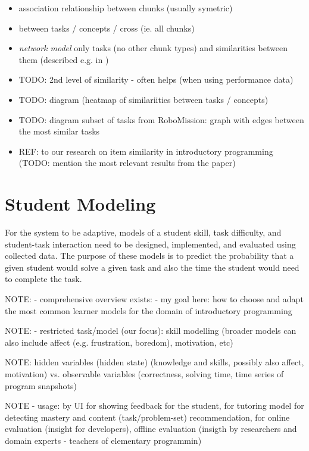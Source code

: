 \begin{itemize}
\item association relationship between chunks (usually symetric)
\item between tasks / concepts / cross (ie. all chunks)
\item \emph{network model} only tasks (no other chunk types) and similarities
  between them (described e.g. in \cite{thran-thesis})
\item TODO: 2nd level of similarity - often helps (when using performance data) \cite{rihak-phd}
\item TODO: diagram (heatmap of similariities between tasks / concepts)
\item TODO: diagram subset of tasks from RoboMission: graph with edges
  between the most similar tasks
\item REF: to our research on item similarity in introductory programming
  (TODO: mention the most relevant results from the paper)
\end{itemize}






\section{Student Modeling}
\label{sec:student-modeling}

For the system to be adaptive, models of
  a student skill, task difficulty, and student-task interaction
  need to be designed, implemented, and evaluated using collected data.
The purpose of these models is to predict the probability that a given student
  would solve a given task
  and also the time the student would need to complete the task.

NOTE:
- comprehensive overview exists: \cite{its-learner-models, pelanek-learner-modeling}
- my goal here: how to choose and adapt the most common learner models for the domain
  of introductory programming

NOTE:
- restricted task/model (our focus): skill modelling
(broader models can also include affect (e.g. frustration, boredom), motivation, etc)

NOTE: hidden variables (hidden state) (knowledge and skills, possibly also affect, motivation)
vs. observable variables (correctness, solving time, time series of program snapshots)


NOTE - usage: by UI for showing feedback for the student, for tutoring model for detecting mastery and content (task/problem-set) recommendation, for online evaluation (insight for developers), offline evaluation (insigth by researchers and domain experts - teachers of elementary programmin)

